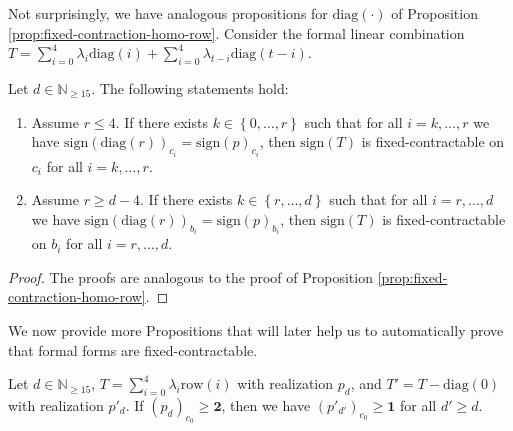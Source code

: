 Not surprisingly, we have analogous propositions for \( \mathrm{diag}(\cdot) \) of Proposition \ref{prop:fixed-contraction-homo-row}. Consider the formal linear combination \(  T = \sum_{i=0}^{4}  \lambda_{i} \mathrm{diag}(i) + \sum_{i=0}^{4}  \lambda_{t-i} \mathrm{diag}(t-i) \).

\begin{proposition}\label{prop:fixed-contraction-homo-diag}
    Let \( d \in \mathbb{N}_{\geq 15} \). The following statements hold:
    \begin{enumerate}
        \item  Assume \( r \leq 4 \). If there exists \( k \in \left\{ 0, \dots, r \right\} \) such that for all \( i = k, \dots, r\) we have \(  \mathrm{sign}(\mathrm{diag}(r))_{c_i} = \mathrm{sign}(p)_{c_i} \),
        then  \( \mathrm{sign}(T) \) is fixed-contractable on \( c_i \) for all \( i = k, \dots, r \).
        \item Assume \( r \geq d-4 \).
        If there exists \( k \in \left\{ r, \dots, d \right\} \) such that for all \( i = r, \dots, d\) we have \(  \mathrm{sign}(\mathrm{diag}(r))_{b_i} = \mathrm{sign}(p)_{b_i} \),
        then  \( \mathrm{sign}(T) \) is fixed-contractable on \( b_i \) for all \( i = r, \dots, d \).
    \end{enumerate}
\end{proposition}

\begin{proof}
    The proofs are analogous to the proof of Proposition \ref{prop:fixed-contraction-homo-row}.
\end{proof}


We now provide more Propositions that will later help us to automatically prove that formal forms are fixed-contractable.

\begin{proposition}\label{prop:row_homo_diag}
    Let \( d \in \mathbb{N}_{\geq 15} \), \( T = \sum_{i=0}^4 \lambda_i \mathrm{row}(i)\) with realization \( p_d \), and \( T' = T - \mathrm{diag}(0) \) with realization \( p'_d \). If \( (p_d)_{c_0} \geq \mathbf{2} \), then we have \( (p'_{d'})_{c_0} \geq \mathbf 1 \) for all \( d' \geq d \).
\end{proposition}

